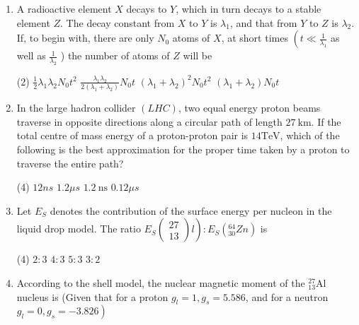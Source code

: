 \begin{enumerate}
	{}
	\begin{tasks}(4)
		\task[\textbf{A.}] ${ }_{54}^{125} \mathrm{Xe}$
		\task[\textbf{B.}] ${ }_{53}^{124} I$
		\task[\textbf{C.}] ${ }_{52}^{125} \mathrm{Te}$
		\task[\textbf{D.}] ${ }_{51}^{125} \mathrm{Sb}$
	\end{tasks}
	\item A radioactive element $X$ decays to $Y$, which in turn decays to a stable element $Z$. The decay constant from $X$ to $Y$ is $\lambda_{1}$, and that from $Y$ to $Z$ is $\lambda_{2} .$ If, to begin with, there are only $N_{0}$ atoms of $X$, at short times $\left(t \ll \frac{1}{\lambda_{1}}\right.$ as well as $\frac{1}{\lambda_{2}}$ ) the number of atoms of $Z$ will be
	{	}
	\begin{tasks}(2)
		\task[\textbf{A.}] $\frac{1}{2} \lambda_{1} \lambda_{2} N_{0} t^{2}$
		\task[\textbf{B.}] $\frac{\lambda_{1} \lambda_{2}}{2\left(\lambda_{1}+\lambda_{2}\right)} N_{0} t$
		\task[\textbf{C.}] $\left(\lambda_{1}+\lambda_{2}\right)^{2} N_{0} t^{2}$
		\task[\textbf{D.}] $\left(\lambda_{1}+\lambda_{2}\right) N_{0} t$
	\end{tasks}
	\item In the large hadron collider $(L H C)$, two equal energy proton beams traverse in opposite directions along a circular path of length $27 \mathrm{~km}$. If the total centre of mass energy of a proton-proton pair is $14 \mathrm{TeV}$, which of the following is the best approximation for the proper time taken by a proton to traverse the entire path?
	{	}
	\begin{tasks}(4)
		\task[\textbf{A.}] $12 n s$
		\task[\textbf{B.}] $1.2 \mu s$
		\task[\textbf{C.}] $1.2 \mathrm{~ns}$
		\task[\textbf{D.}] $0.12 \mu s$
	\end{tasks}
	\item Let $E_{S}$ denotes the contribution of the surface energy per nucleon in the liquid drop model. The ratio $\left.E_{S}\left(\begin{array}{l}27 \\ 13\end{array}\right) l\right): E_{S}\left({ }_{30}^{64} Z n\right)$ is
	{}
	\begin{tasks}(4)
		\task[\textbf{A.}]  $2: 3$
		\task[\textbf{B.}] $4: 3$
		\task[\textbf{C.}] $5: 3$
		\task[\textbf{D.}] $3: 2$
	\end{tasks}
	\item 	According to the shell model, the nuclear magnetic moment of the ${ }_{13}^{27} \mathrm{Al}$ nucleus is (Given that for a proton $g_{l}=1, g_{s}=5.586$, and for a neutron $\left.g_{l}=0, g_{s}=-3.826\right)$

\end{enumerate}
